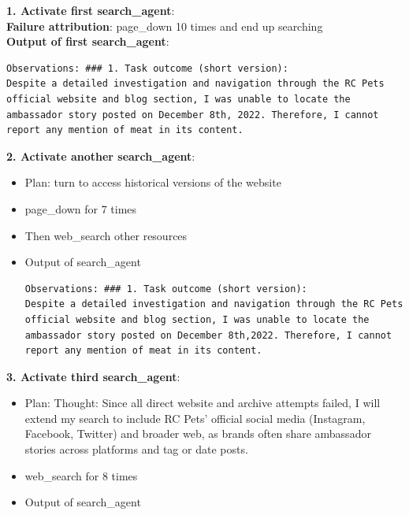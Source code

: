 \begin{tcolorbox}[
        colback=gray!5!white,
        colframe=gray!50!black,
        title=Smolagent,
        floatplacement=Hp,
        breakable  %
    ]
    \textbf{1. Activate first search\_agent}:\\
    \textbf{Failure attribution}: page\_down 10 times and end up searching \\
    \textbf{Output of first search\_agent}:
    \begin{lstlisting}[basicstyle=\ttfamily\small, breaklines=true, columns=fixed, breakindent=0pt, xleftmargin=0pt, gobble=0]
Observations: ### 1. Task outcome (short version):
Despite a detailed investigation and navigation through the RC Pets official website and blog section, I was unable to locate the ambassador story posted on December 8th, 2022. Therefore, I cannot report any mention of meat in its content.
\end{lstlisting}
    \textbf{2. Activate another search\_agent}:
    \begin{itemize}[leftmargin=1em]
        \item Plan: turn to access historical versions of the website
        \item page\_down for 7 times
        \item Then web\_search other resources
        \item Output of search\_agent
              \begin{lstlisting}[basicstyle=\ttfamily\small, breaklines=true, columns=fixed, breakindent=0pt, xleftmargin=0pt, gobble=0]
Observations: ### 1. Task outcome (short version):
Despite a detailed investigation and navigation through the RC Pets official website and blog section, I was unable to locate the ambassador story posted on December 8th,2022. Therefore, I cannot report any mention of meat in its content.
\end{lstlisting}
    \end{itemize}
    \textbf{3. Activate third search\_agent}:
    \begin{itemize}[leftmargin=1em]
        \item Plan: Thought: Since all direct website and archive attempts failed, I will extend my search to include RC Pets' official social media (Instagram, Facebook, Twitter) and broader web, as brands often share ambassador stories across platforms and tag or date posts.
        \item web\_search for 8 times
        \item Output of search\_agent

\end{itemize}
\end{tcolorbox}
